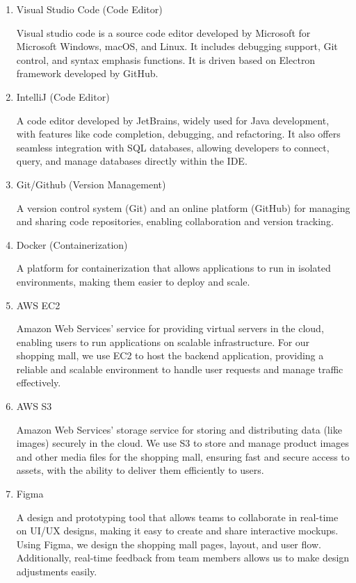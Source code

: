 \documentclass[conference]{IEEEtran}
\begin{document}
\begin{enumerate}
\setlength{\parindent}{2ex}
\setlength{\parskip}{0.5em}
\item Visual Studio Code (Code Editor)

Visual studio code is a source code editor developed by Microsoft for Microsoft Windows, macOS, and Linux. It includes debugging support, Git control, and syntax emphasis functions. It is driven based on Electron framework developed by GitHub.

\item IntelliJ (Code Editor)

A code editor developed by JetBrains, widely used for Java development, with features like code completion, debugging, and refactoring. It also offers seamless integration with SQL databases, allowing developers to connect, query, and manage databases directly within the IDE.

\item Git/Github (Version Management)

A version control system (Git) and an online platform (GitHub) for managing and sharing code repositories, enabling collaboration and version tracking.

\item Docker (Containerization)

A platform for containerization that allows applications to run in isolated environments, making them easier to deploy and scale.

\item AWS EC2

Amazon Web Services’ service for providing virtual servers in the cloud, enabling users to run applications on scalable infrastructure. For our shopping mall, we use EC2 to host the backend application, providing a reliable and scalable environment to handle user requests and manage traffic effectively.

\item AWS S3

Amazon Web Services’ storage service for storing and distributing data (like images) securely in the cloud. We use S3 to store and manage product images and other media files for the shopping mall, ensuring fast and secure access to assets, with the ability to deliver them efficiently to users.

\item Figma

A design and prototyping tool that allows teams to collaborate in real-time on UI/UX designs, making it easy to create and share interactive mockups. Using Figma, we design the shopping mall pages, layout, and user flow. Additionally, real-time feedback from team members allows us to make design adjustments easily.


\end{enumerate}
\end{document}
